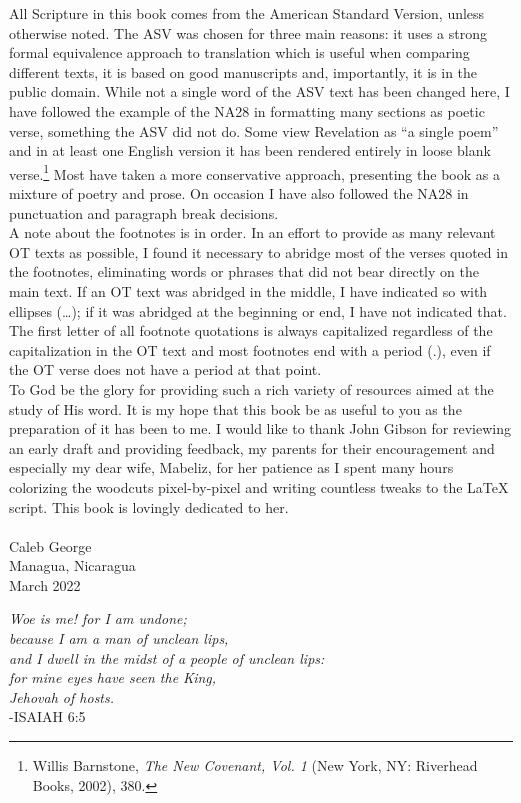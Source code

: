 All Scripture in this book comes from the American Standard Version, unless otherwise noted. The \textsc{ASV} was chosen for three main reasons: it uses a strong formal equivalence approach to translation which is useful when comparing different texts, it is based on good manuscripts and, importantly, it is in the public domain. While not a single word of the \textsc{ASV} text has been changed here, I have followed the example of the \textsc{NA28} in formatting many sections as poetic verse, something the \textsc{ASV} did not do. Some view Revelation as ``a single poem'' and in at least one English version it has been rendered entirely in loose blank verse.\footnote{Willis Barnstone, \textit{The New Covenant, Vol. 1} (New York, NY: Riverhead Books, 2002), 380.} Most have taken a more conservative approach, presenting the book as a mixture of poetry and prose. On occasion I have also followed the \textsc{NA28} in punctuation and paragraph break decisions.\\

A note about the footnotes is in order. In an effort to provide as many relevant OT texts as possible, I found it necessary to abridge most of the verses quoted in the footnotes, eliminating words or phrases that did not bear directly on the main text. If an OT text was abridged in the middle, I have indicated so with ellipses (\ldots); if it was abridged at the beginning or end, I have not indicated that. The first letter of all footnote quotations is always capitalized regardless of the capitalization in the OT text and most footnotes end with a period (.), even if the OT verse does not have a period at that point.\\

To God be the glory for providing such a rich variety of resources aimed at the study of His word. It is my hope that this book be as useful to you as the preparation of it has been to me. I would like to thank John Gibson for reviewing an early draft and providing feedback, my parents for their encouragement and especially my dear wife, Mabeliz, for her patience as I spent many hours colorizing the woodcuts pixel-by-pixel and writing countless tweaks to the \LaTeX{} script. This book is lovingly dedicated to her.\\
\\
Caleb George\\
Managua, Nicaragua\\
March 2022
\clearpage
\ClearShipoutPicture
\cleartorecto
\begin{vplace}
\begin{center}
\textit{
Woe is me! for I am undone; \\
because I am a man of unclean lips, \\
and I dwell in the midst of a people of unclean lips: \\
for mine eyes have seen the King, \\
Jehovah of hosts.} \\
-ISAIAH 6:5
\end{center}
\end{vplace}

